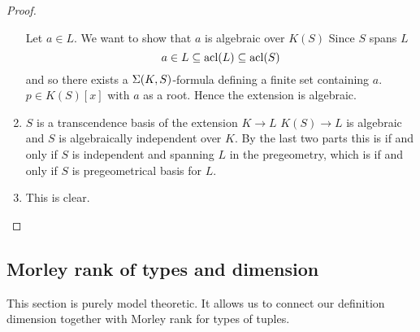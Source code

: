 \begin{proof}
\begin{enumerate}
        \begin{backward}
            Let $a \in L$.
            We want to show that $a$ is algebraic over $K(S)$
            Since $S$ spans $L$
            \[a \in L \subseteq \operatorname{acl}(L) \subseteq \operatorname{acl}(S)\]
            and so there exists a $\Sigma(K,S)$-formula defining a finite set 
            containing $a$.
             $p \in K(S)[x]$ with $a$ as a root.
            Hence the extension is algebraic.
        \end{backward}

        \item
            $S$ is a transcendence basis of the extension $K \to L$ 
            $K(S) \to L$ is algebraic and $S$ is 
            algebraically independent over $K$.
            By the last two parts this is if and only if $S$ is independent 
            and spanning $L$ in the pregeometry, 
            which is if and only if $S$ is pregeometrical basis for $L$.
        
        \item This is clear.
    \end{enumerate}
\end{proof}

\subsection{Morley rank of types and dimension}
This section is purely model theoretic.
It allows us to connect our definition dimension together with Morley rank 
for types of tuples.


